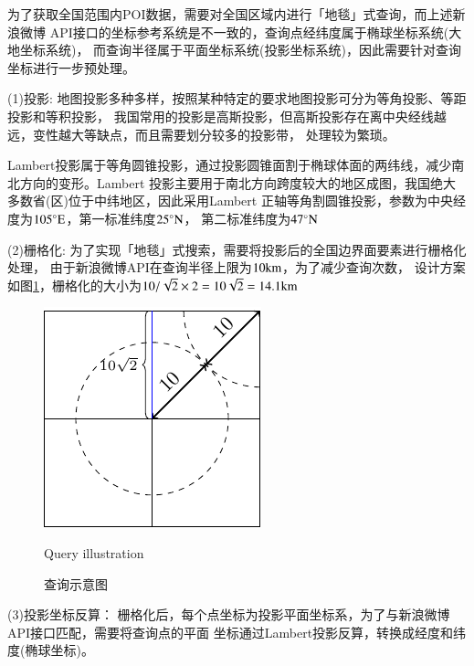 为了获取全国范围内POI数据，需要对全国区域内进行「地毯」式查询，而上述新浪微博
API接口的坐标参考系统是不一致的，查询点经纬度属于椭球坐标系统(大地坐标系统)，
而查询半径属于平面坐标系统(投影坐标系统)，因此需要针对查询坐标进行一步预处理。

(1)投影:
地图投影多种多样，按照某种特定的要求地图投影可分为等角投影、等距投影和等积投影\cite{Yang1999Map}，
我国常用的投影是高斯投影，但高斯投影存在离中央经线越远，变性越大等缺点，而且需要划分较多的投影带，
处理较为繁琐。
	
Lambert投影属于等角圆锥投影，通过投影圆锥面割于椭球体面的两纬线，减少南北方向的变形。Lambert
投影主要用于南北方向跨度较大的地区成图，我国绝大多数省(区)位于中纬地区，因此采用Lambert
正轴等角割圆锥投影，参数为中央经度为$105^{\circ}\text{\textrm{E}}$，第一标准纬度$25^{\circ}\text{\textrm{N}}$，
第二标准纬度为$47^{\circ}\text{\textrm{N}}$

(2)栅格化:
为了实现「地毯」式搜索，需要将投影后的全国边界面要素进行栅格化处理，
由于新浪微博API在查询半径上限为$10\text{\textrm{km}}$，为了减少查询次数，
设计方案如图\ref{fig:grid}，栅格化的大小为$10/\sqrt{2} \times 2 =10\sqrt{2}=14.1\text{\textrm{km}}$
\begin{figure}
\centering
\includegraphics[scale=0.8]{figures/query.pdf}

\caption{查询示意图}{Query illustration}
\label{fig:grid}
\end{figure}

(3)投影坐标反算：
栅格化后，每个点坐标为投影平面坐标系，为了与新浪微博API接口匹配，需要将查询点的平面
坐标通过Lambert投影反算，转换成经度和纬度(椭球坐标)。

